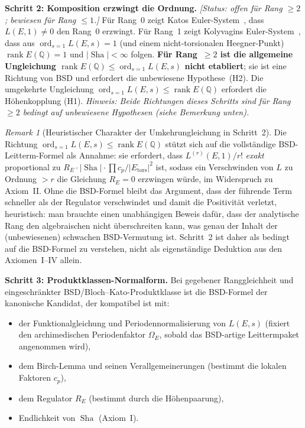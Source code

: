 \documentclass[aps,prd,twocolumn,superscriptaddress,nofootinbib,floatfix]{revtex4-2}
\theoremstyle{definition}
\theoremstyle{remark}
\newtheorem{remark}[theorem]{Remark}
\DeclareMathOperator{\ord}{ord}
\DeclareMathOperator{\rank}{rank}
\DeclareMathOperator{\Sha}{Sha}
\begin{document}
\textbf{Schritt 2: Komposition erzwingt die Ordnung.} \textit{[Status: offen für Rang $\geq 2$; bewiesen für Rang $\leq 1$.]} Für Rang~0 zeigt Katos Euler-System~\cite{Kato2004}, dass $L(E,1) \neq 0$ den Rang~0 erzwingt. Für Rang~1 zeigt Kolyvagins Euler-System~\cite{Kolyvagin1990}, dass aus $\ord_{s=1}L(E,s)=1$ (und einem nicht-torsionalen Heegner-Punkt) $\rank E(\mathbb{Q})=1$ und $|\Sha|<\infty$ folgen. \textbf{Für Rang~$\geq 2$ ist die allgemeine Ungleichung $\rank E(\mathbb{Q}) \leq \ord_{s=1} L(E,s)$ nicht etabliert}; sie ist eine Richtung von BSD und erfordert die unbewiesene Hypothese~(H2). Die umgekehrte Ungleichung $\ord_{s=1} L(E,s) \leq \rank E(\mathbb{Q})$ erfordert die Höhenkopplung (H1). \textit{Hinweis: Beide Richtungen dieses Schritts sind für Rang~$\geq 2$ bedingt auf unbewiesene Hypothesen (siehe Bemerkung unten).}

\begin{remark}[Heuristischer Charakter der Umkehrungleichung in Schritt~2]
Die Richtung $\ord_{s=1} L(E,s) \leq \rank E(\mathbb{Q})$ stützt sich auf die vollständige BSD-Leitterm-Formel als Annahme: sie erfordert, dass $L^{(r)}(E,1)/r!$ \textit{exakt} proportional zu $R_E \cdot |\Sha| \cdot \prod c_p / |E_{\mathrm{tors}}|^2$ ist, sodass ein Verschwinden von $L$ zu Ordnung $> r$ die Gleichung $R_E = 0$ erzwingen würde, im Widerspruch zu Axiom~II. Ohne die BSD-Formel bleibt das Argument, dass \glqq der führende Term schneller als der Regulator verschwindet und damit die Positivität verletzt\grqq{}, heuristisch: man brauchte einen unabhängigen Beweis dafür, dass der analytische Rang den algebraischen nicht überschreiten kann, was genau der Inhalt der (unbewiesenen) schwachen BSD-Vermutung ist. Schritt~2 ist daher als bedingt auf die BSD-Formel zu verstehen, nicht als eigenständige Deduktion aus den Axiomen~I--IV allein.
\end{remark}

\textbf{Schritt 3: Produktklassen-Normalform.} Bei gegebener Ranggleichheit und eingeschränkter BSD/Bloch--Kato-Produktklasse ist die BSD-Formel der kanonische Kandidat, der kompatibel ist mit:
\begin{itemize}
\item der Funktionalgleichung und Periodennormalisierung von $L(E,s)$ (fixiert den archimedischen Periodenfaktor $\Omega_E$, sobald das BSD-artige Leittermpaket angenommen wird),
\item dem Birch-Lemma und seinen Verallgemeinerungen (bestimmt die lokalen Faktoren $c_p$),
\item dem Regulator $R_E$ (bestimmt durch die Höhenpaarung),
\item Endlichkeit von $\Sha$ (Axiom~I).
\end{itemize}
\end{document}
